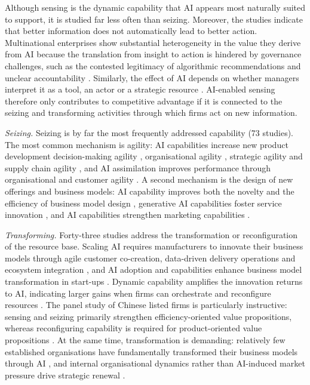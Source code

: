 Although sensing is the dynamic capability that AI appears most naturally suited to support, it is studied far less often than seizing. Moreover, the studies indicate that better information does not automatically lead to better action. Multinational enterprises show substantial heterogeneity in the value they derive from AI because the translation from insight to action is hindered by governance challenges, such as the contested legitimacy of algorithmic recommendations and unclear accountability . Similarly, the effect of AI depends on whether managers interpret it as a tool, an actor or a strategic resource . AI-enabled sensing therefore only contributes to competitive advantage if it is connected to the seizing and transforming activities through which firms act on new information.

\emph{Seizing.} Seizing is by far the most frequently addressed capability (73 studies). The most common mechanism is agility: AI capabilities increase new product development decision-making agility , organisational agility , strategic agility  and supply chain agility , and AI assimilation improves performance through organisational and customer agility . A second mechanism is the design of new offerings and business models: AI capability improves both the novelty and the efficiency of business model design , generative AI capabilities foster service innovation , and AI capabilities strengthen marketing capabilities .

\emph{Transforming.} Forty-three studies address the transformation or reconfiguration of the resource base. Scaling AI requires manufacturers to innovate their business models through agile customer co-creation, data-driven delivery operations and ecosystem integration , and AI adoption and capabilities enhance business model transformation in start-ups . Dynamic capability amplifies the innovation returns to AI, indicating larger gains when firms can orchestrate and reconfigure resources . The panel study of Chinese listed firms is particularly instructive: sensing and seizing primarily strengthen efficiency-oriented value propositions, whereas reconfiguring capability is required for product-oriented value propositions . At the same time, transformation is demanding: relatively few established organisations have fundamentally transformed their business models through AI , and internal organisational dynamics rather than AI-induced market pressure drive strategic renewal .

